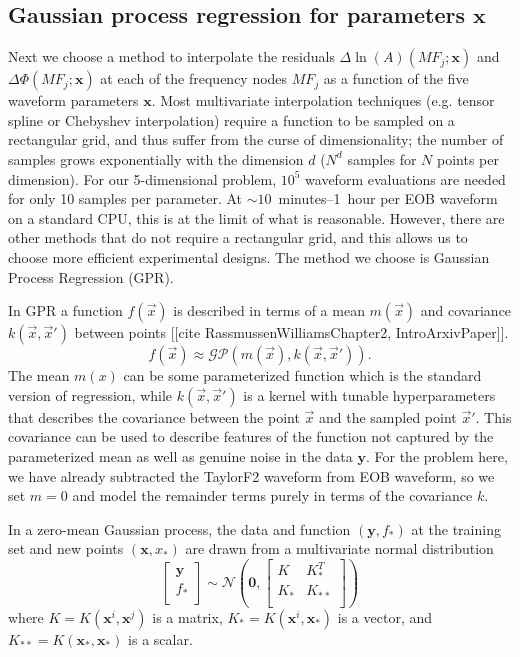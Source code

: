\documentclass[prd,aps,letter,twocolumn,floatfix,notitlepage,nofootinbib]{revtex4-1}
\def\bx{\mathbf{x}}
\begin{document}
\subsection{Gaussian process regression for parameters $\bx$}

Next we choose a method to interpolate the residuals $\Delta\ln(A)(MF_j; \bx)$ and $\Delta\Phi(MF_j; \bx)$ at each of the frequency nodes $MF_j$ as a function of the five waveform parameters $\bx$. Most multivariate interpolation techniques (e.g. tensor spline or Chebyshev interpolation) require a function to be sampled on a rectangular grid, and thus suffer from the curse of dimensionality; the number of samples grows exponentially with the dimension $d$ ($N^d$ samples for $N$ points per dimension). For our 5-dimensional problem, $10^5$ waveform evaluations are needed for only 10 samples per parameter. At $\sim10$~minutes--1~hour per EOB waveform on a standard CPU, this is at the limit of what is reasonable. However, there are other methods that do not require a rectangular grid, and this allows us to choose more efficient experimental designs. The method we choose is Gaussian Process Regression (GPR).

In GPR a function $f(\vec x)$ is described in terms of a mean $m(\vec x)$ and  covariance $k(\vec x, \vec x')$ between points [[cite RassmussenWilliamsChapter2, IntroArxivPaper]].
\begin{equation}
f(\vec x) \approx \mathcal{GP}(m(\vec x), k(\vec x, \vec x')).
\end{equation}
The mean $m(x)$ can be some parameterized function which is the standard version of regression, while $k(\vec x, \vec x')$ is a kernel with tunable hyperparameters that describes the covariance between the point $\vec x$ and the sampled point $\vec x'$. This covariance can be used to describe features of the function not captured by the parameterized mean as well as genuine noise in the data ${\bm y}$. For the problem here, we have already subtracted the TaylorF2 waveform from EOB waveform, so we set $m=0$ and model the remainder terms purely in terms of the covariance $k$. 

In a zero-mean Gaussian process, the data and function $({\bm y}, f_*)$ at the training set and new points $({\bm x}, x_*)$ are drawn from a multivariate normal distribution
\begin{equation}
\label{eq:gaussian}
\begin{bmatrix}
{\bm y} \\
f_* \\
\end{bmatrix}
\sim \mathcal{N}
\left({\bm 0}, 
\begin{bmatrix}
K & K_*^T \\
K_* & K_{**} \\
\end{bmatrix}
\right)
\end{equation}
where $K = K({\bm x}^i, {\bm x}^j)$ is a matrix, $K_* = K({\bm x}^i, {\bm x}_*)$ is a vector, and $K_{**} = K({\bm x}_*, {\bm x}_*)$ is a scalar.
\end{document}
